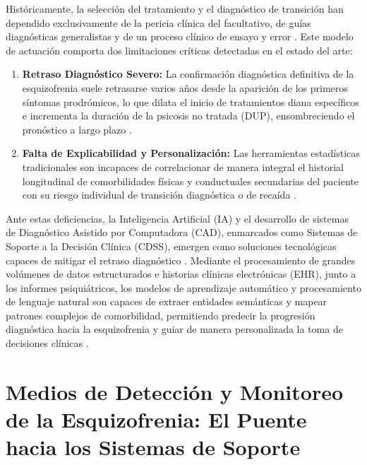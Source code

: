 \documentclass[12pt,a4paper,onecolumn,oneside]{report}
\begin{document}
Históricamente, la selección del tratamiento y el diagnóstico de transición han dependido exclusivamente de la pericia clínica del facultativo, de guías diagnósticas generalistas y de un proceso clínico de ensayo y error \cite{saboori2025predictive}. Este modelo de actuación comporta dos limitaciones críticas detectadas en el estado del arte:
\begin{enumerate}
    \item \textbf{Retraso Diagnóstico Severo:} La confirmación diagnóstica definitiva de la esquizofrenia suele retrasarse varios años desde la aparición de los primeros síntomas prodrómicos, lo que dilata el inicio de tratamientos diana específicos e incrementa la duración de la psicosis no tratada (DUP), ensombreciendo el pronóstico a largo plazo \cite{hansen2025predicting}.
    \item \textbf{Falta de Explicabilidad y Personalización:} Las herramientas estadísticas tradicionales son incapaces de correlacionar de manera integral el historial longitudinal de comorbilidades físicas y conductuales secundarias del paciente con su riesgo individual de transición diagnóstica o de recaída \cite{saboori2025predictive, hansen2025predicting}.
\end{enumerate}

Ante estas deficiencias, la Inteligencia Artificial (IA) y el desarrollo de sistemas de Diagnóstico Asistido por Computadora (CAD), enmarcados como Sistemas de Soporte a la Decisión Clínica (CDSS), emergen como soluciones tecnológicas capaces de mitigar el retraso diagnóstico \cite{hansen2025predicting}. Mediante el procesamiento de grandes volúmenes de datos estructurados e historias clínicas electrónicas (EHR), junto a los informes psiquiátricos, los modelos de aprendizaje automático y procesamiento de lenguaje natural son capaces de extraer entidades semánticas y mapear patrones complejos de comorbilidad, permitiendo predecir la progresión diagnóstica hacia la esquizofrenia y guiar de manera personalizada la toma de decisiones clínicas \cite{saboori2025predictive, hansen2025predicting}.

\section{Medios de Detección y Monitoreo de la Esquizofrenia: El Puente hacia los Sistemas de Soporte}
\end{document}

